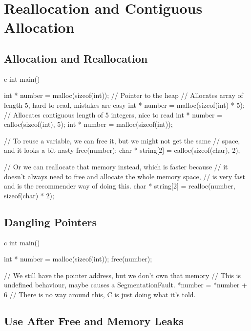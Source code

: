 \section{Reallocation and Contiguous Allocation}\label{sec:realloc_and_calloc}

\subsection{Allocation and Reallocation}\label{sub:allocation_and_reallocation}

\begin{code}{c}
    int main() {
        int * number = malloc(sizeof(int)); // Pointer to the heap
        // Allocates array of length 5, hard to read, mistakes are easy
        int * number = malloc(sizeof(int) * 5); 
        // Allocates contiguous length of 5 integers, nice to read
        int * number = calloc(sizeof(int), 5); 
        int * number = malloc(sizeof(int));

        // To reuse a variable, we can free it, but we might not get the same
        // space, and it looks a bit nasty
        free(number);
        char * string[2] = calloc(sizeof(char), 2);

        // Or we can reallocate that memory instead, which is faster because 
        // it doesn't always need to free and allocate the whole memory space,
        // is very fast and is the recommender way of doing this.
        char * string[2] = realloc(number, sizeof(char) * 2);
    }
\end{code}

\subsection{Dangling Pointers}\label{sub:dangling_pointers}

\begin{code}{c}
    int main() {
        int * number = malloc(sizeof(int));
        free(number);

        // We still have the pointer address, but we don't own that memory
        // This is undefined behaviour, maybe causes a SegmentationFault.
        *number = *number + 6
        // There is no way around this, C is just doing what it's told.
    }
\end{code}

\subsection{Use After Free and Memory Leaks}\label{sub:use_after_free}

